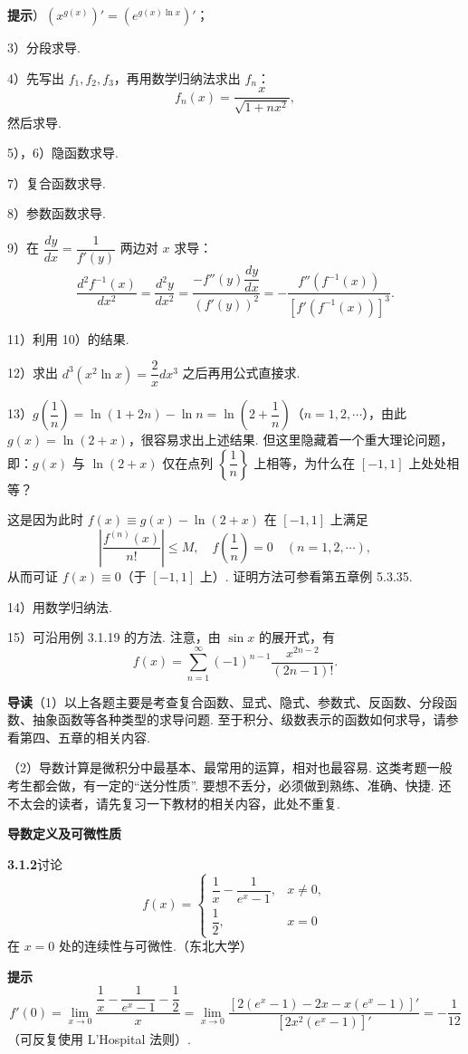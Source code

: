 \documentclass[UTF8, 12pt, fontset=fandol, oneside]{ctexart}
\begin{document}
\noindent\textbf{提示}）$(x^{g(x)})'=(e^{g(x)\ln x})'$；

3）分段求导.

4）先写出 $f_1,f_2,f_3$，再用数学归纳法求出 $f_n$：
\[
  f_n(x)=\frac{x}{\sqrt{1+nx^2}},
\]
然后求导.

5），6）隐函数求导.

7）复合函数求导.

8）参数函数求导.

9）在 $\dfrac{dy}{dx}=\dfrac1{f'(y)}$ 两边对 $x$ 求导：
\[
  \frac{d^2f^{-1}(x)}{dx^2}=\frac{d^2y}{dx^2}
  =\frac{-f''(y)\dfrac{dy}{dx}}{(f'(y))^2}
  =-\frac{f''(f^{-1}(x))}{[f'(f^{-1}(x))]^3}.
\]

11）利用 10）的结果.

12）求出 $d^3(x^2\ln x)=\dfrac2x dx^3$ 之后再用公式直接求.

13）$g\left(\dfrac1n\right)=\ln(1+2n)-\ln n=\ln\left(2+\dfrac1n\right)$（$n=1,2,\cdots$），由此 $g(x)=\ln(2+x)$，很容易求出上述结果. 但这里隐藏着一个重大理论问题，即：$g(x)$ 与 $\ln(2+x)$ 仅在点列 $\left\{\dfrac1n\right\}$ 上相等，为什么在 $[-1,1]$ 上处处相等？

这是因为此时 $f(x)\equiv g(x)-\ln(2+x)$ 在 $[-1,1]$ 上满足
\[
  \left|\frac{f^{(n)}(x)}{n!}\right|\le M,\quad f\left(\frac1n\right)=0\quad(n=1,2,\cdots),
\]
从而可证 $f(x)\equiv0$（于 $[-1,1]$ 上）. 证明方法可参看第五章例 5.3.35.

14）用数学归纳法.

15）可沿用例 3.1.19 的方法. 注意，由 $\sin x$ 的展开式，有
\[
  f(x)=\sum_{n=1}^\infty(-1)^{n-1}\frac{x^{2n-2}}{(2n-1)!}.
\]

\noindent\textbf{导读}\quad （1）以上各题主要是考查复合函数、显式、隐式、参数式、反函数、分段函数、抽象函数等各种类型的求导问题. 至于积分、级数表示的函数如何求导，请参看第四、五章的相关内容.

（2）导数计算是微积分中最基本、最常用的运算，相对也最容易. 这类考题一般考生都会做，有一定的“送分性质”. 要想不丢分，必须做到熟练、准确、快捷. 还不太会的读者，请先复习一下教材的相关内容，此处不重复.

\noindent\textbf{导数定义及可微性质}

\noindent\textbf{3.1.2}\quad 讨论
\[
f(x)=
\begin{cases}
\dfrac1x-\dfrac1{e^x-1}, & x\ne0,\\
\dfrac12, & x=0
\end{cases}
\]
在 $x=0$ 处的连续性与可微性.（东北大学）

\noindent\textbf{提示}\quad
\[
  f'(0)=\lim_{x\to0}\frac{\dfrac1x-\dfrac1{e^x-1}-\dfrac12}{x}
  =\lim_{x\to0}\frac{[2(e^x-1)-2x-x(e^x-1)]'}{[2x^2(e^x-1)]'}
  =-\frac1{12}
\]
（可反复使用 L'Hospital 法则）.
\end{document}
